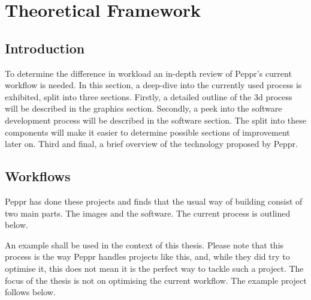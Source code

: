 %
\chapter{Theoretical Framework}

\section{Introduction}
To determine the difference in workload an in-depth review of Peppr's current workflow is needed. In this section, a deep-dive into the currently used process is exhibited, split into three sections. Firstly, a detailed outline of the 3d process will be described in the graphics section. Secondly, a peek into the software development process will be described in the software section. The split into these components will make it easier to determine possible sections of improvement later on. Third and final, a brief overview of the technology proposed by Peppr.

\section{Workflows}
Peppr has done these projects and finds that the usual way of building consist of two main parts. The images and the software. The current process is outlined below. 

An example shall be used in the context of this thesis. Please note that this process is the way Peppr handles projects like this, and, while they did try to optimise it, this does not mean it is the perfect way to tackle such a project. The focus of the thesis is not on optimising the current workflow. The example project follows below.



